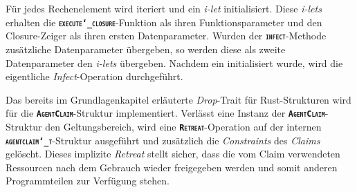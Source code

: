Für jedes Rechenelement wird iteriert und ein \textit{i-let} initialisiert.
Diese \textit{i-lets} erhalten die \texttt{\textsc{\textbf{execute\char`_closure}}}-Funktion als ihren
Funktionsparameter und den Closure-Zeiger als ihren ersten Datenparameter.
Wurden der \texttt{\textsc{\textbf{infect}}}-Methode zusätzliche Datenparameter
übergeben, so werden diese als zweite Datenparameter den \textit{i-lets} übergeben.
Nachdem ein  initialisiert wurde, wird die eigentliche \textit{Infect}-Operation durchgeführt.

Das bereits im Grundlagenkapitel erläuterte \textit{Drop}-Trait für Rust-Strukturen wird für die
\texttt{\textsc{\textbf{AgentClaim}}}-Struktur implementiert.
Verlässt eine Instanz der \texttt{\textsc{\textbf{AgentClaim}}}-Struktur den Geltungsbereich,
wird eine \texttt{\textsc{\textbf{Retreat}}}-Operation auf der
internen \texttt{\textsc{\textbf{agentclaim\char`_t}}}-Struktur ausgeführt und zusätzlich
die \textit{Constraints} des \textit{Claims} gelöscht. Dieses implizite \textit{Retreat}
stellt sicher, dass die vom Claim verwendeten Ressourcen nach dem Gebrauch wieder freigegeben werden und
somit anderen Programmteilen zur Verfügung stehen.
